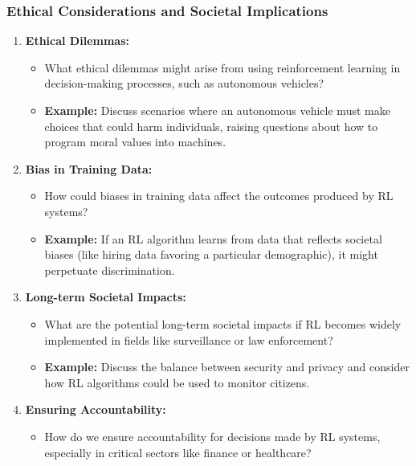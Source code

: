 \documentclass[aspectratio=169]{beamer}
\begin{document}
\begin{frame}[fragile]
  \frametitle{Ethical Considerations and Societal Implications}
  \begin{enumerate}
    \item \textbf{Ethical Dilemmas:}
      \begin{itemize}
        \item What ethical dilemmas might arise from using reinforcement learning in decision-making processes, such as autonomous vehicles?
        \item \textbf{Example:} Discuss scenarios where an autonomous vehicle must make choices that could harm individuals, raising questions about how to program moral values into machines.
      \end{itemize}
    
    \item \textbf{Bias in Training Data:}
      \begin{itemize}
        \item How could biases in training data affect the outcomes produced by RL systems?
        \item \textbf{Example:} If an RL algorithm learns from data that reflects societal biases (like hiring data favoring a particular demographic), it might perpetuate discrimination.
      \end{itemize}

    \item \textbf{Long-term Societal Impacts:}
      \begin{itemize}
        \item What are the potential long-term societal impacts if RL becomes widely implemented in fields like surveillance or law enforcement?
        \item \textbf{Example:} Discuss the balance between security and privacy and consider how RL algorithms could be used to monitor citizens.
      \end{itemize}
  
    \item \textbf{Ensuring Accountability:}
      \begin{itemize}
        \item How do we ensure accountability for decisions made by RL systems, especially in critical sectors like finance or healthcare?
      \end{itemize}
  \end{enumerate}
\end{frame}
\end{document}
